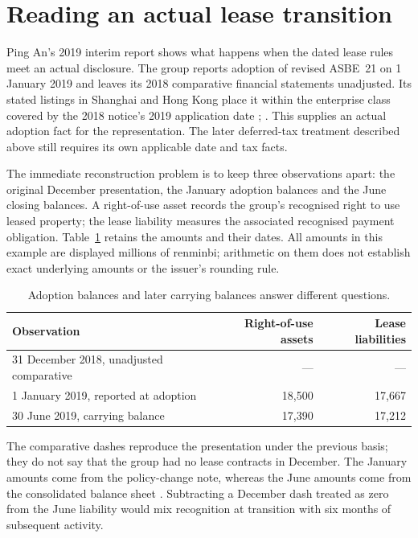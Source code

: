 \section{Reading an actual lease transition}
\label{sec:pingan-lease-transition}

Ping An's 2019 interim report shows what happens when the dated lease rules
meet an actual disclosure. The group reports adoption of revised ASBE~21 on
1 January 2019 and leaves its 2018 comparative financial statements
unadjusted. Its stated listings in Shanghai and Hong Kong place it within
the enterprise class covered by the 2018 notice's 2019 application date
\citep[pp.\ 112--113]{pingan2019asbe};
\citep[notice, para.\ I]{moflease2018}. This supplies an actual adoption
fact for the representation. The later deferred-tax treatment described
above still requires its own applicable date and tax facts.

The immediate reconstruction problem is to keep three observations apart:
the original December presentation, the January adoption balances and the
June closing balances. A right-of-use asset records the group's recognised
right to use leased property; the lease liability measures the associated
recognised payment obligation. Table~\ref{tab:pingan-lease-balances} retains
the amounts and their dates. All amounts in this example are displayed
millions of renminbi; arithmetic on them does not establish exact underlying
amounts or the issuer's rounding rule.

\begin{table}[htbp]
\centering
\caption{Adoption balances and later carrying balances answer different questions.}
\label{tab:pingan-lease-balances}
\begin{tabular}{@{}lrr@{}}
\toprule
Observation & Right-of-use assets & Lease liabilities \\
\midrule
31 December 2018, unadjusted comparative & --- & --- \\
1 January 2019, reported at adoption & 18,500 & 17,667 \\
30 June 2019, carrying balance & 17,390 & 17,212 \\
\bottomrule
\end{tabular}
\end{table}

The comparative dashes reproduce the presentation under the previous basis;
they do not say that the group had no lease contracts in December. The
January amounts come from the policy-change note, whereas the June amounts
come from the consolidated balance sheet
\citep[pp.\ 99--100, 112]{pingan2019asbe}. Subtracting a December dash
treated as zero from the June liability would mix recognition at transition
with six months of subsequent activity.

